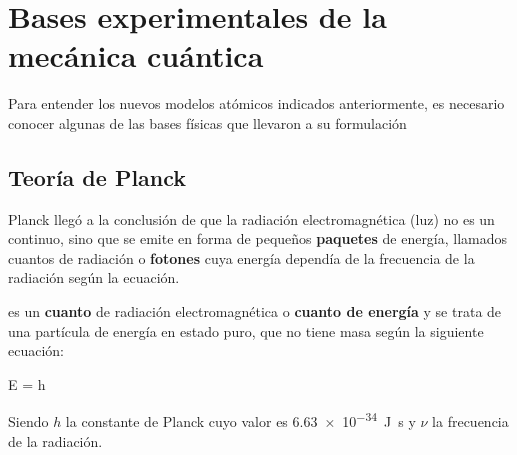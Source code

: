 


\section{Bases experimentales de la mecánica cuántica}

Para entender los nuevos modelos atómicos indicados anteriormente, es necesario conocer algunas de las bases físicas que llevaron a su formulación

\subsection{Teoría de Planck}\label{subsec:teoria-de-planck}

Planck llegó a la conclusión de que la radiación electromagnética (luz) no es un continuo, sino que se emite en forma de pequeños \textbf{paquetes} de energía, llamados cuantos de radiación o \textbf{fotones} cuya energía dependía de la frecuencia de la radiación según la ecuación.
\begin{definition}[Fotón]
    es un \textbf{cuanto} de radiación electromagnética o \textbf{cuanto de energía} y se trata de una partícula de energía en estado puro, que no tiene masa según la siguiente ecuación:
    \begin{centeredequation}
        E = h\ \nu\label{eq:energia_relativista}
    \end{centeredequation}
    Siendo \(h\) la constante de Planck cuyo valor es \SI{6.63e-34}{\joule\s} y \(\nu\) la frecuencia de la radiación.
\end{definition}

